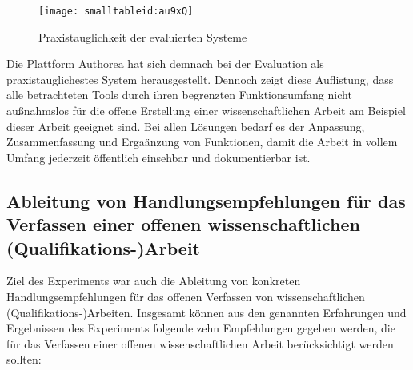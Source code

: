 \begin{itemize}
\end{itemize}

\begin{figure}[h!]
\texttt{[image: smalltableid:au9xQ]}
\caption{Praxistauglichkeit der evaluierten Systeme}
\end{figure}

Die Plattform Authorea hat sich demnach bei der Evaluation als praxistauglichestes System herausgestellt. Dennoch zeigt diese Auflistung, dass alle betrachteten Tools durch ihren begrenzten Funktionsumfang nicht außnahmslos für die offene Erstellung einer wissenschaftlichen Arbeit am Beispiel dieser Arbeit geeignet sind. Bei allen Lösungen bedarf es der Anpassung, Zusammenfassung und Ergaänzung von Funktionen, damit die Arbeit in vollem Umfang jederzeit öffentlich einsehbar und dokumentierbar ist.

\subsection{Ableitung von Handlungsempfehlungen für das Verfassen einer offenen wissenschaftlichen (Qualifikations-)Arbeit}

Ziel des Experiments war auch die Ableitung von konkreten Handlungsempfehlungen für das offenen Verfassen von wissenschaftlichen (Qualifikations-)Arbeiten. Insgesamt können aus den genannten Erfahrungen und Ergebnissen des Experiments folgende zehn Empfehlungen gegeben werden, die für das Verfassen einer offenen wissenschaftlichen Arbeit berücksichtigt werden sollten:

